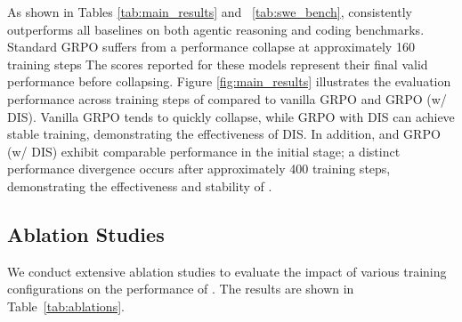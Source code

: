 




As shown in Tables \ref{tab:main_results} and ~\ref{tab:swe_bench}, \model consistently outperforms all baselines on both agentic reasoning and coding benchmarks. Standard GRPO
suffers from a performance collapse at approximately 160
training steps
The scores reported for these models represent their final valid performance before collapsing.
Figure \ref{fig:main_results} illustrates the evaluation performance across training steps of \model compared to vanilla GRPO and GRPO (w/ DIS). Vanilla GRPO tends to quickly collapse, while GRPO with DIS can achieve stable training, demonstrating the effectiveness of DIS. 
In addition, \model and GRPO (w/ DIS) exhibit comparable performance in the initial stage; a distinct performance divergence occurs after approximately 400 training steps, demonstrating the effectiveness and stability of \model.





\subsection{Ablation Studies}
We conduct extensive ablation studies to evaluate the impact of various training configurations on the performance of \model. The results are shown in Table~\ref{tab:ablations}.

